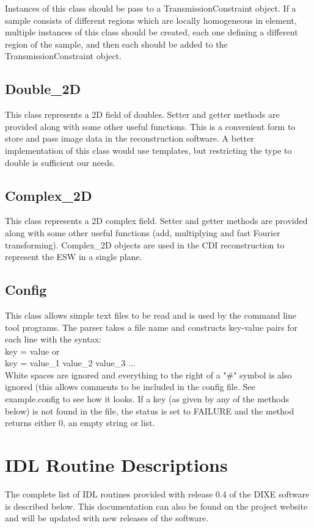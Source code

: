 \documentclass[]{cxs-software}
\begin{document}
Instances of this class should be pass to a TransmissionConstraint
object. If a sample consists of different regions which are locally
homogeneous in element, multiple instances of this class should be
created, each one defining a different region of the sample, and then
each should be added to the TransmissionConstraint object.

\subsection{Double\_2D}
This class represents a 2D field of doubles. Setter and getter methods
are provided along with some other useful functions. This is a
convenient form to store and pass image data in the reconstruction
software. A better implementation of this class would use templates,
but restricting the type to double is sufficient our needs.

\subsection{Complex\_2D}
This class represents a 2D complex field. Setter and getter methods
are provided along with some other useful functions (add, multiplying
and fast Fourier transforming). Complex\_2D objects are used in the CDI
reconstruction to represent the ESW in a single plane.

\subsection{Config}
This class allows simple text files to be read and is used by the
command line tool programs. The parser takes a file name and
constructs key-value pairs for each line with the syntax:\\ 
key = value or \\
key = value\_1 value\_2 value\_3 ... \\
White spaces are ignored and everything to the right of a "\#" symbol
is also ignored (this allows comments to be included in the config
file. See example.config to see how it looks. If a key (as given by
any of the methods below) is not found in the file, the status is set
to FAILURE and the method returns either 0, an empty string or list.


\section{IDL Routine Descriptions}
\label{sec:idl_routines}
The complete list of IDL routines provided with release 0.4 of the
DIXE software is described below. This documentation can also be found
on the project website and will be updated with new releases of the
software.
\end{document}
